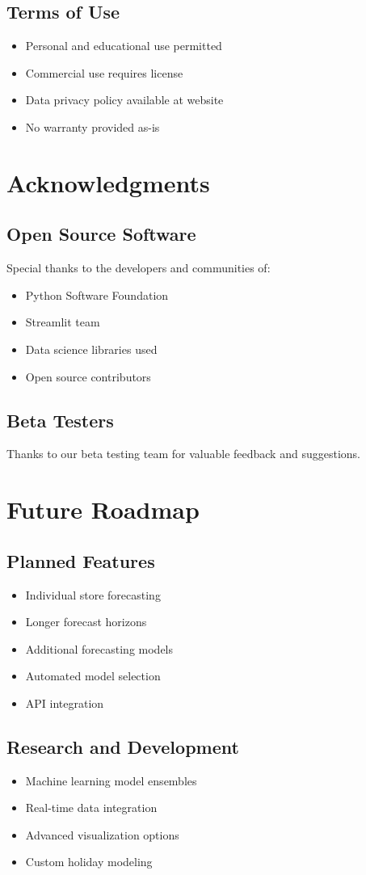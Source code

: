 \subsection{Terms of Use}
\begin{itemize}
	\item Personal and educational use permitted
	\item Commercial use requires license
	\item Data privacy policy available at website
	\item No warranty provided as-is
\end{itemize}

\section{Acknowledgments}

\subsection{Open Source Software}
Special thanks to the developers and communities of:
\begin{itemize}
	\item Python Software Foundation
	\item Streamlit team
	\item Data science libraries used
	\item Open source contributors
\end{itemize}

\subsection{Beta Testers}
Thanks to our beta testing team for valuable feedback and suggestions.

\section{Future Roadmap}

\subsection{Planned Features}
\begin{itemize}
	\item Individual store forecasting
	\item Longer forecast horizons
	\item Additional forecasting models
	\item Automated model selection
	\item API integration
\end{itemize}

\subsection{Research and Development}
\begin{itemize}
	\item Machine learning model ensembles
	\item Real-time data integration
	\item Advanced visualization options
	\item Custom holiday modeling
\end{itemize}